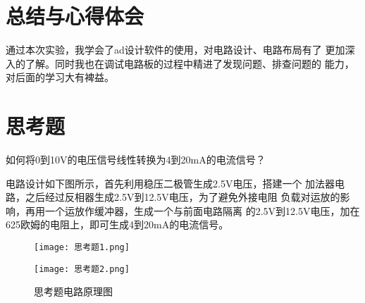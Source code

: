 \documentclass{zjureport}
\begin{document}
\section{总结与心得体会}
通过本次实验，我学会了ad设计软件的使用，对电路设计、电路布局有了
更加深入的了解。同时我也在调试电路板的过程中精进了发现问题、排查问题的
能力，对后面的学习大有裨益。

\section{思考题}
如何将0到10V的电压信号线性转换为4到20mA的电流信号？\par
电路设计如下图所示，首先利用稳压二极管生成2.5V电压，搭建一个
加法器电路，之后经过反相器生成2.5V到12.5V电压，为了避免外接电阻
负载对运放的影响，再用一个运放作缓冲器，生成一个与前面电路隔离
的2.5V到12.5V电压，加在625欧姆的电阻上，即可生成4到20mA的电流信号。
\begin{figure}[H]
  \begin{minipage}{0.9\linewidth}
    \centering
    \texttt{[image: 思考题1.png]}
  \end{minipage}

  \quad

  \begin{minipage}{0.9\linewidth}
    \centering
    \texttt{[image: 思考题2.png]}
  \end{minipage}
  \caption{思考题电路原理图}
\end{figure}
\end{document}
